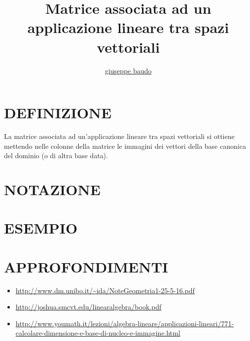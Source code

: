 \documentclass[a4paper,10pt]{article}
\title{Matrice associata ad un applicazione lineare tra spazi vettoriali}
\author{\href{http://www.baudo.hol.es}{giuseppe baudo}}
\begin{document}
\maketitle

\section{DEFINIZIONE}
La matrice associata ad un'applicazione lineare tra spazi vettoriali si ottiene mettendo nelle colonne della matrice
le immagini dei vettori della base canonica del dominio (o di altra base data).

\section{NOTAZIONE}

\section{ESEMPIO}

\section{APPROFONDIMENTI}
\begin{itemize}
 \item \url{http://www.dm.unibo.it/~ida/NoteGeometria1-25-5-16.pdf}
 \item \url{http://joshua.smcvt.edu/linearalgebra/book.pdf}
 \item \url{http://www.youmath.it/lezioni/algebra-lineare/applicazioni-lineari/771-calcolare-dimensione-e-base-di-nucleo-e-immagine.html}
\end{itemize}
\end{document}
